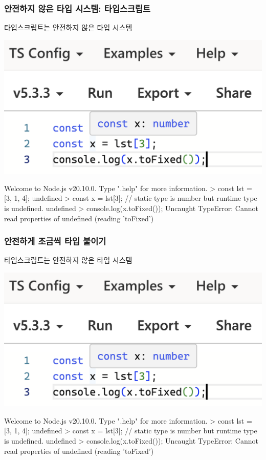 \documentclass{beamer}
\begin{document}
\begin{frame}[c, fragile]
  \frametitle{안전하지 않은 타입 시스템: 타입스크립트}

  타입스크립트는 안전하지 않은 타입 시스템

  \begin{center}
    \includegraphics[width=0.6\linewidth]{img/ts-unsound.png}
  \end{center}

  \begin{tscode}
Welcome to Node.js v20.10.0.
Type ".help" for more information.
> const lst = [3, 1, 4];
undefined
> const x = lst[3];  // static type is number but runtime type is undefined.
undefined
> console.log(x.toFixed());
Uncaught TypeError: Cannot read properties of undefined (reading 'toFixed')
  \end{tscode}
\end{frame}

\begin{frame}[c, fragile]
  \frametitle{안전하게 조금씩 타입 붙이기}

  타입스크립트는 안전하지 않은 타입 시스템

  \begin{center}
    \includegraphics[width=0.6\linewidth]{img/ts-unsound.png}
  \end{center}

  \begin{tscode}
Welcome to Node.js v20.10.0.
Type ".help" for more information.
> const lst = [3, 1, 4];
undefined
> const x = lst[3];  // static type is number but runtime type is undefined.
undefined
> console.log(x.toFixed());
Uncaught TypeError: Cannot read properties of undefined (reading 'toFixed')
  \end{tscode}
\end{frame}
\end{document}
